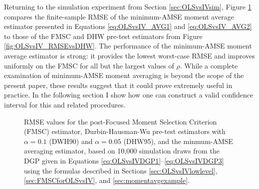 Returning to the simulation experiment from Section \ref{sec:OLSvsIVsim}, Figure \ref{fig:OLSvsIV_AVG} compares the finite-sample RMSE of the minimum-AMSE moment average estimator presented in Equations \ref{eq:OLSvsIV_AVG1} and \ref{eq:OLSvsIV_AVG2} to those of the FMSC and DHW pre-test estimators from Figure \ref{fig:OLSvsIV_RMSEvsDHW}.
The performance of the minimum-AMSE moment average estimator is strong: it provides the lowest worst-case RMSE and improves uniformly on the FMSC for all but the largest values of $\rho$.
While a complete examination of minimum-AMSE moment averaging is beyond the scope of the present paper, these results suggest that it could prove extremely useful in practice.
In the following section I show how one can construct a valid confidence interval for this and related procedures.
\begin{figure}
\centering
	
	\caption{RMSE values for the post-Focused Moment Selection Criterion (FMSC) estimator, Durbin-Hausman-Wu pre-test estimators with $\alpha = 0.1$ (DWH90) and $\alpha = 0.05$ (DHW95), and the minmum-AMSE averaging estimator, based on 10,000 simulation draws from the DGP given in Equations \ref{eq:OLSvsIVDGP1}--\ref{eq:OLSvsIVDGP3} using the formulas described in Sections \ref{sec:OLSvsIVlowlevel}, \ref{sec:FMSCforOLSvsIV}, and \ref{sec:momentavgexample}.}
	\label{fig:OLSvsIV_AVG}
\end{figure}